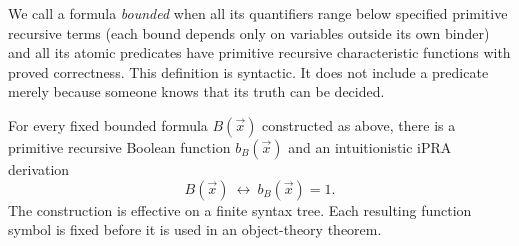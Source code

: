 We call a formula \emph{bounded} when all its quantifiers range below specified
primitive recursive terms (each bound depends only on variables outside its
own binder) and all its atomic predicates have primitive
recursive characteristic functions with proved correctness.  This definition
is syntactic.  It does not include a predicate merely because someone knows
that its truth can be decided.

\begin{theorem}
\label{logic:booleanization}
For every fixed bounded formula $B(\vec x)$ constructed as above, there is a
primitive recursive Boolean function $b_B(\vec x)$ and an intuitionistic iPRA
derivation
\[
 B(\vec x)\ \longleftrightarrow\ b_B(\vec x)=1.
\]
The construction is effective on a finite syntax tree.  Each resulting
function symbol is fixed before it is used in an object-theory theorem.
\end{theorem}

